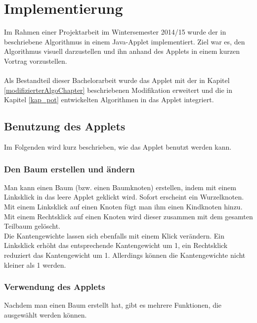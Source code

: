\section{Implementierung}\label{kap_implementierung}

Im Rahmen einer Projektarbeit im Wintersemester 2014/15 wurde der in \cite{cima_paper} beschriebene Algorithmus in einem Java-Applet implementiert. Ziel war es, den Algorithmus visuell darzustellen und ihn anhand des Applets in einem kurzen Vortrag vorzustellen.
\\
\\
Als Bestandteil dieser Bachelorarbeit wurde das Applet mit der in Kapitel \ref{modifizierterAlgoChapter} beschriebenen Modifikation erweitert und die in Kapitel \ref{kap_pot} entwickelten Algorithmen in das Applet integriert.


\subsection*{Benutzung des Applets}

Im Folgenden wird kurz beschrieben, wie das Applet benutzt werden kann.

\subsubsection*{Den Baum erstellen und ändern}

Man kann einen Baum (bzw. einen Baumknoten) erstellen, indem mit einem Linksklick in das leere Applet geklickt wird. Sofort erscheint ein Wurzelknoten.\\
Mit einem Linksklick auf einen Knoten fügt man ihm einen Kindknoten hinzu. Mit einem Rechtsklick auf einen Knoten wird dieser zusammen mit dem gesamten Teilbaum gelöscht.\\
Die Kantengewichte lassen sich ebenfalls mit einem Klick verändern. Ein Linksklick erhöht das entsprechende Kantengewicht um 1, ein Rechtsklick reduziert das Kantengewicht um 1. Allerdings können die Kantengewichte nicht kleiner als 1 werden.


\subsubsection*{Verwendung des Applets}

Nachdem man einen Baum erstellt hat, gibt es mehrere Funktionen, die ausgewählt werden können.\\


